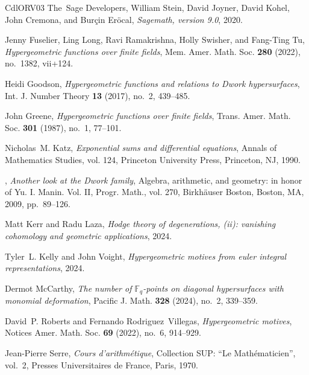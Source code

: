 \documentclass[11pt, reqno]{amsart}
\theoremstyle{plain}
\theoremstyle{definition}
\begin{document}
\begin{thebibliography}{CdlORV03}
The~Sage Developers, William Stein, David Joyner, David Kohel, John Cremona, and Burçin Eröcal, \emph{Sagemath, version 9.0}, 2020.

Jenny Fuselier, Ling Long, Ravi Ramakrishna, Holly Swisher, and Fang-Ting Tu, \emph{Hypergeometric functions over finite fields}, Mem. Amer. Math. Soc. \textbf{280} (2022), no.~1382, vii+124. 

Heidi Goodson, \emph{Hypergeometric functions and relations to {D}work hypersurfaces}, Int. J. Number Theory \textbf{13} (2017), no.~2, 439--485. 

John Greene, \emph{Hypergeometric functions over finite fields}, Trans. Amer. Math. Soc. \textbf{301} (1987), no.~1, 77--101. 

Nicholas~M. Katz, \emph{Exponential sums and differential equations}, Annals of Mathematics Studies, vol. 124, Princeton University Press, Princeton, NJ, 1990. 

\bysame, \emph{Another look at the {D}work family}, Algebra, arithmetic, and geometry: in honor of {Y}u. {I}. {M}anin. {V}ol. {II}, Progr. Math., vol. 270, Birkh\"auser Boston, Boston, MA, 2009, pp.~89--126. 

Matt Kerr and Radu Laza, \emph{Hodge theory of degenerations, (ii): vanishing cohomology and geometric applications}, 2024.

Tyler~L. Kelly and John Voight, \emph{Hypergeometric motives from euler integral representations}, 2024.

Dermot McCarthy, \emph{The number of {$\mathbb{F}_q$}-points on diagonal hypersurfaces with monomial deformation}, Pacific J. Math. \textbf{328} (2024), no.~2, 339--359. 

David~P. Roberts and Fernando Rodriguez~Villegas, \emph{Hypergeometric motives}, Notices Amer. Math. Soc. \textbf{69} (2022), no.~6, 914--929. 

Jean-Pierre Serre, \emph{Cours d'arithm\'etique}, Collection SUP: ``Le Math\'ematicien'', vol.~2, Presses Universitaires de France, Paris, 1970. 


\end{thebibliography}
\end{document}
